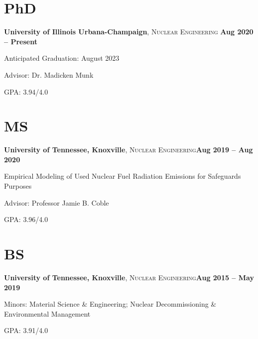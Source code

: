 \documentclass[margin,line]{resume}
\begin{document}
\begin{resume}
    \section{\mysidestyle PhD}
    \textbf{University of Illinois Urbana-Champaign}, \textsc{Nuclear Engineering}\hfill \textbf{ Aug 2020 -- Present}\vspace{-3mm}\\\vspace{-1mm}%
    \begin{list2}
        \item Anticipated Graduation: August 2023
        \item Advisor: Dr. Madicken Munk
        \item GPA: 3.94/4.0
    \end{list2}\vspace{-1.5mm}
    \section{\mysidestyle MS}
    \textbf{University of Tennessee, Knoxville}, \textsc{Nuclear Engineering}\hfill\textbf{Aug 2019 -- Aug 2020}\vspace{-3mm}\\\vspace{-1mm}%
    \begin{list2}
        \item Empirical Modeling of Used Nuclear Fuel Radiation Emissions for Safeguards Purposes
        \item Advisor: Professor Jamie B. Coble
        \item GPA: 3.96/4.0
    \end{list2}
    \section{\mysidestyle BS}
    \textbf{University of Tennessee, Knoxville}, \textsc{Nuclear Engineering}\hfill\textbf{Aug 2015 -- May 2019}\vspace{-3mm}\\\vspace{-1mm}%
    \begin{list2}
        \item Minors: Material Science \& Engineering; Nuclear 
              Decommissioning \& Environmental Management
        \item GPA: 3.91/4.0
    \end{list2}
    

\end{resume}
\end{document}
